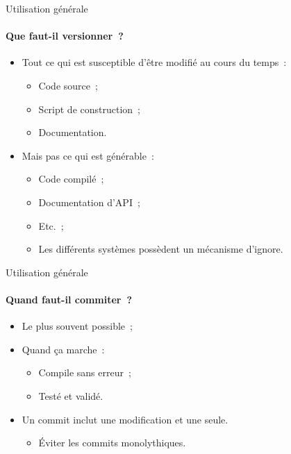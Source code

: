 \begin{frame}{Utilisation générale}
\framesubtitle{Que faut-il versionner~?}
\begin{itemize}[<+->]
 \item Tout ce qui est susceptible d'être modifié au cours du temps~:
 \begin{itemize}[<+->]
  \item Code source~;
  \item Script de construction~;
  \item Documentation.
 \end{itemize}
 \item Mais pas ce qui est générable~:
 \begin{itemize}[<+->]
  \item Code compilé~;
  \item Documentation d'API~;
  \item Etc.~;
  \item Les différents systèmes possèdent un mécanisme d'ignore.
 \end{itemize}
\end{itemize}
\end{frame}

\begin{frame}{Utilisation générale}
\framesubtitle{Quand faut-il commiter~?}
\begin{itemize}[<+->]
 \item Le plus souvent possible~;
 \item Quand ça marche~:
 \begin{itemize}[<+->]
  \item Compile sans erreur~;
  \item Testé et validé.
 \end{itemize}
 \item Un commit inclut une modification et une seule.
 \begin{itemize}[<+->]
  \item Éviter les commits monolythiques.
 \end{itemize}
\end{itemize}
\end{frame}

